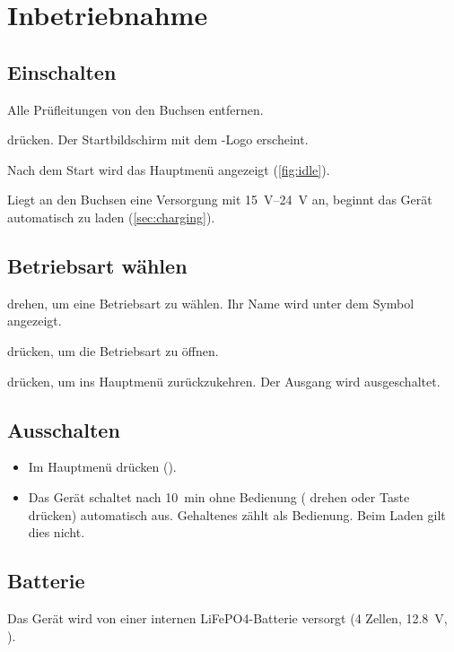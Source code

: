 \section{Inbetriebnahme}
\label{sec:start}

\subsection{Einschalten}
\begin{steps}
    \item Alle Prüfleitungen von den Buchsen entfernen.
    \item {} drücken. Der Startbildschirm mit dem \ST{}-Logo erscheint.
    \item Nach dem Start wird das Hauptmenü angezeigt (\autoref{fig:idle}).
\end{steps}

\begin{note}
    Liegt an den Buchsen eine Versorgung mit \qtyrange{15}{24}{\volt} an, beginnt das Gerät
    automatisch zu laden (\autoref{sec:charging}).
\end{note}

\subsection{Betriebsart wählen}
\begin{steps}
    \item \enc{} drehen, um eine Betriebsart zu wählen. Ihr Name wird unter dem Symbol angezeigt.
    \item {} drücken, um die Betriebsart zu öffnen.
    \item {} drücken, um ins Hauptmenü zurückzukehren. Der Ausgang wird ausgeschaltet.
\end{steps}

\subsection{Ausschalten}
\begin{itemize}
    \item Im Hauptmenü  drücken ().
    \item Das Gerät schaltet nach \qty{10}{\minute} ohne Bedienung (\enc{} drehen oder Taste drücken)
          automatisch aus. Gehaltenes  zählt als Bedienung. Beim Laden gilt dies nicht.
\end{itemize}

\subsection{Batterie}
Das Gerät wird von einer internen \ac{LiFePO4}-Batterie versorgt
(4 Zellen, \qty{12.8}{\volt}, ).

